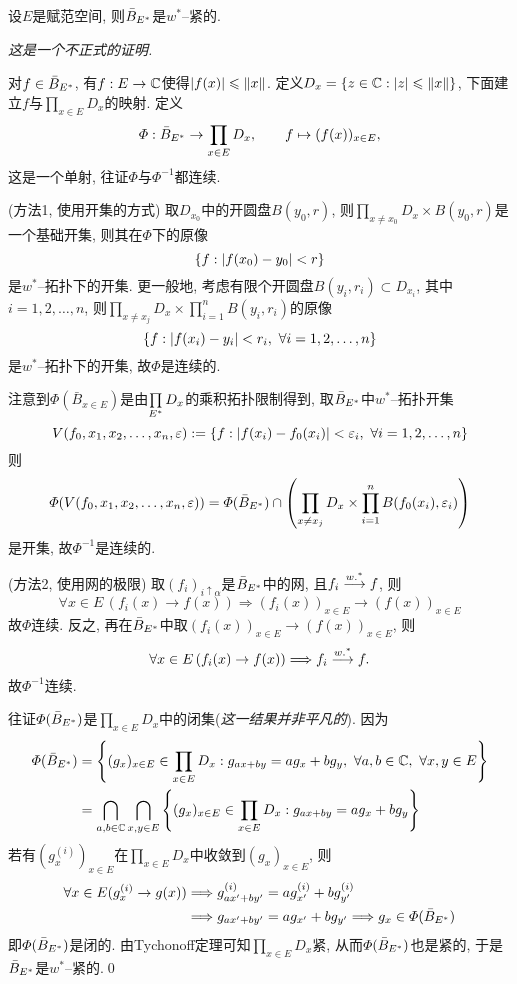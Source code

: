 	\begin{Theorem}
	设$ E $是赋范空间, 则$ \bar{B}_{E^{*}} $是$ w^* $--紧的.
	\end{Theorem}
	\begin{Proof}
	\textsl{这是一个不正式的证明.}
	
	对$ f\in\bar{B}_{E^{*}} $, 有$ f : E\to\mathbb{C} $使得$ \left| f(x) \right| \leqslant\left\| x \right\| $. 定义$ D_x=\{ z\in\mathbb{C} : \left| z \right| \leqslant\left\| x \right\| \} $, 下面建立$ f $与$ \prod\limits_{x\in E}D_x $的映射. 定义
	\[
	\varPhi : \bar{B}_{E^{*}}\to\prod_{x\in E}D_x,\qquad f\mapsto(f(x))_{x\in E},
	\]
	这是一个单射, 往证$ \varPhi $与$ \varPhi^{-1} $都连续.
	
	(方法1, 使用开集的方式) 取$ D_{x_0} $中的开圆盘$ B(y_0,r) $, 则$ \prod\limits_{x\ne x_0}D_x\times B(y_0,r) $是一个基础开集, 则其在$ \varPhi $下的原像
	\[
	\{ f : \left| f(x_0)-y_0 \right| <r \}
	\]
	是$ w^* $--拓扑下的开集. 更一般地, 考虑有限个开圆盘$ B(y_i,r_i)\subset D_{x_i} $, 其中$ i=1,2,\dots,n $, 则$ \prod\limits_{x\ne x_j}D_x\times\prod\limits_{i=1}^nB(y_i,r_i) $的原像
	\[
	\{ f : \left| f(x_i)-y_i \right| <r_i,\ \forall i = 1,2,\dots,n \}
	\]
	是$ w^* $--拓扑下的开集, 故$ \varPhi $是连续的.
	
	注意到$ \varPhi(\bar{B}_{x\in E}) $是由$ \prod\limits_{E^{*}}D_x $的乘积拓扑限制得到, 取$ \bar{B}_{E^{*}} $中$ w^* $--拓扑开集
	\[
	V(f_0,x_{1}, x_{2}, \dots, x_{n},\varepsilon):=\{ f : \left| f(x_i)-f_0(x_i) \right| <\varepsilon_i,\ \forall i=1,2,\dots,n \}
	\]
	则
	\[
	\varPhi(V(f_0,x_{1}, x_{2}, \dots, x_{n},\varepsilon))=\varPhi(\bar{B}_{E^{*}})\cap\left(\prod_{x\ne x_j}D_x\times\prod_{i=1}^nB(f_0(x_i),\varepsilon_i)\right)
	\]
	是开集, 故$ \varPhi^{-1} $是连续的.
	
	(方法2, 使用网的极限) 取$ (f_i)_{i\uparrow\alpha} $是$ \bar{B}_{E^{*}} $中的网, 且$ f_i\overset{w.^{*}}{\longrightarrow} f $, 则
	\[
	\forall x\in E\,(f_i(x)\to f(x))\Longrightarrow (f_i(x))_{x\in E}\to(f(x))_{x\in E}
	\]
	故$ \varPhi $连续. 反之, 再在$ \bar{B}_{E^{*}} $中取$ (f_i(x))_{x\in E}\to (f(x))_{x\in E} $, 则
	\[
	\forall x\in E\,(f_i(x)\to f(x))\Longrightarrow f_i\overset{w.^{*}}{\longrightarrow} f.
	\]
	故$ \varPhi^{-1} $连续.
	
	往证$ \varPhi(\bar{B}_{E^{*}}) $是$ \prod\limits_{x\in E}D_x $中的闭集(\textsl{这一结果并非平凡的}). 因为
	\[
	\begin{aligned}
	\varPhi(\bar{B}_{\Star{E}})&=\left\{ (g_x)_{x\in E}\in\prod_{x\in E}D_x : g_{ax+by}=ag_x+bg_y,\ \forall a,b\in\C,\ \forall x,y\in E \right\}\\
	&=\bigcap_{a,b\in\C}\bigcap_{x,y\in E}\left\{ (g_x)_{x\in E}\in\prod_{x\in E}D_x : g_{ax+by}=ag_x+bg_y \right\}
	\end{aligned}
	\]
	若有$ (g_x^{(i)})_{x\in E} $在$ \prod\limits_{x\in E}D_x $中收敛到$ (g_x)_{x\in E} $, 则
	\[
	\begin{aligned}
	\forall x\in E(g_x^{(i)}\to g(x))&\Longrightarrow g_{ax'+by'}^{(i)}=ag_{x'}^{(i)}+bg_{y'}^{(i)}\\
	&\Longrightarrow g_{ax'+by'}=ag_{x'}+bg_{y'}\Longrightarrow g_x\in\varPhi(\bar{B}_{E^{*}})
	\end{aligned}
	\]
	即$ \varPhi(\bar{B}_{E^{*}}) $是闭的. 由Tychonoff定理可知$ \prod\limits_{x\in E}D_x $紧, 从而$ \varPhi(\bar{B}_{E^{*}}) $也是紧的, 于是$ \bar{B}_{E^{*}} $是$ w^* $--紧的.\qed
	\end{Proof}
	
